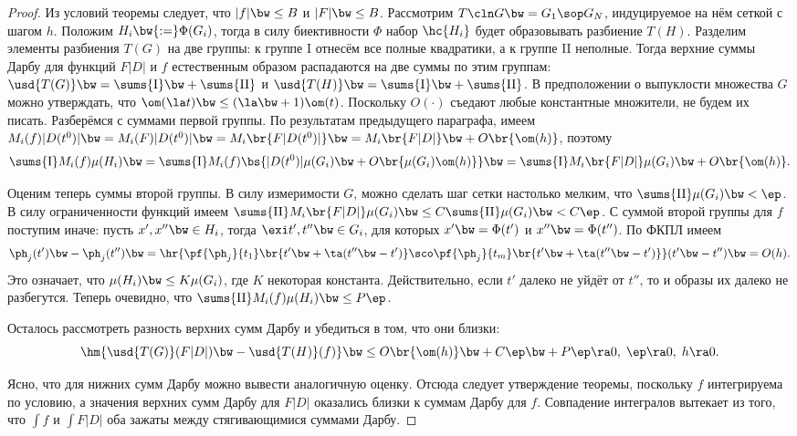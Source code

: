 \documentclass[a4paper]{article}
\newcommand{\ppht}[2]{\pf{\ph_{{#1}}}{t_{{#2}}}}
\newcommand{\sumfi}{\sums{\mathrm{I}}}
\newcommand{\sumse}{\sums{\mathrm{II}}}
\begin{document}
\begin{proof}
Из условий теоремы следует, что $|f| \bw\le B$ и $|F| \bw\le B$. Рассмотрим $T\cln G \bw= G_1\sop G_N$,
индуцируемое на нём сеткой с шагом $h$. Положим $H_i \bw{:=} \Phi(G_i)$, тогда в силу биективности
$\Phi$ набор $\hc{H_i}$ будет образовывать разбиение $T(H)$. Разделим элементы разбиения $T(G)$ на
две группы: к группе I отнесём все полные квадратики, а к группе II неполные. Тогда верхние
суммы Дарбу для функций $F|D|$ и $f$ естественным образом распадаются на две суммы по этим группам:
$\usd{T(G)} \bw= \sumfi \bw+ \sumse$ и $\usd{T(H)} \bw= \sumfi \bw+ \sumse$. В предположении о выпуклости
множества $G$ можно утверждать, что $\om(\la t) \bw\le (\la \bw+ 1)\om(t)$. Поскольку $O(\cdot)$ съедают
любые константные множители, не будем их писать. Разберёмся с суммами первой группы. По результатам
предыдущего параграфа, имеем $M_i(f)|D(t^0)| \bw= M_i(F)|D(t^0)| \bw= M_i\br{F|D(t^0)|} \bw= M_i\br{F|D|}
\bw+ O\br{\om(h)}$, поэтому
$$\sumfi M_i(f) \mu(H_i) \bw= \sumfi M_i(f)\bs{ |D(t^0)|\mu(G_i) \bw+ O\br{\mu(G_i)\om(h)} } \bw=
\sumfi M_i\br{F|D|}\mu(G_i) \bw+ O\br{\om(h)}.$$

Оценим теперь суммы второй группы. В силу измеримости $G$, можно сделать шаг сетки настолько
мелким, что $\sumse \mu(G_i) \bw< \ep$. В силу ограниченности функций имеем $\sumse
M_i\br{F|D|}\mu(G_i) \bw\le C\sumse \mu(G_i) \bw< C\ep$. С суммой второй группы для $f$ поступим иначе:
пусть $x', x'' \bw\in H_i$, тогда $\exi t',t'' \bw\in G_i$, для которых $x' \bw= \Phi(t')$ и $x'' \bw=
\Phi(t'')$. По ФКПЛ имеем
$$\ph_j(t') \bw- \ph_j(t'') \bw= \hr{\ppht j1\br{t' \bw+ \ta(t''\bw-t')} \sco \ppht jm
\br{t' \bw+ \ta(t''\bw-t')}}(t' \bw- t'') \bw= O(h).$$
Это означает, что $\mu(H_i) \bw\le K\mu(G_i)$, где
$K$ некоторая константа. Действительно, если $t'$ далеко не уйдёт от $t''$, то и образы их
далеко не разбегутся. Теперь очевидно, что $\sumse M_i(f)\mu(H_i) \bw\le P\ep$.

Осталось рассмотреть разность верхних сумм Дарбу и убедиться в том, что они близки:
$$\hm{\usd{T(G)}(F|D|)\bw- \usd{T(H)}(f)} \bw\le O\br{\om(h)} \bw+ C\ep \bw+ P\ep \ra 0, \; \ep \ra 0,\; h \ra 0.$$

Ясно, что для нижних сумм Дарбу можно вывести аналогичную оценку. Отсюда следует утверждение
теоремы, поскольку $f$ интегрируема по условию, а значения верхних сумм Дарбу для $F|D|$ оказались
близки к суммам Дарбу для $f$. Совпадение интегралов вытекает из того, что $\int f$ и $\int F|D|$
оба зажаты между стягивающимися суммами Дарбу.
\end{proof}
\end{document}
